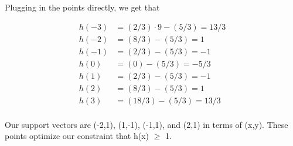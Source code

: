 \documentclass[submit]{harvardml}
\newenvironment{answer}{%
    \color{answergreen}\bf}
  {%
  }
\begin{document}
\begin{enumerate}
\begin{answer}


    Plugging in the points directly, we get that 

    \begin{align*}
        h(-3) &= (2/3)\cdot 9 - (5/3) =  13/3 \\
        h(-2) &= (8/3) - (5/3) =  1 \\
        h(-1) &= (2/3) - (5/3) =  -1 \\
        h(0) &= (0) - (5/3) =  -5/3 \\
        h(1) &= (2/3) - (5/3) =  -1 \\
        h(2) &= (8/3) - (5/3) =  1 \\
        h(3) &= (18/3) - (5/3) =  13/3 \\
    \end{align*}

    Our support vectors are (-2,1), (1,-1),  (-1,1), and (2,1) in terms of (x,y). These points
    optimize our constraint that h(x) $\geq$ 1.




\end{answer}

    \end{enumerate}
\newpage
\end{document}
